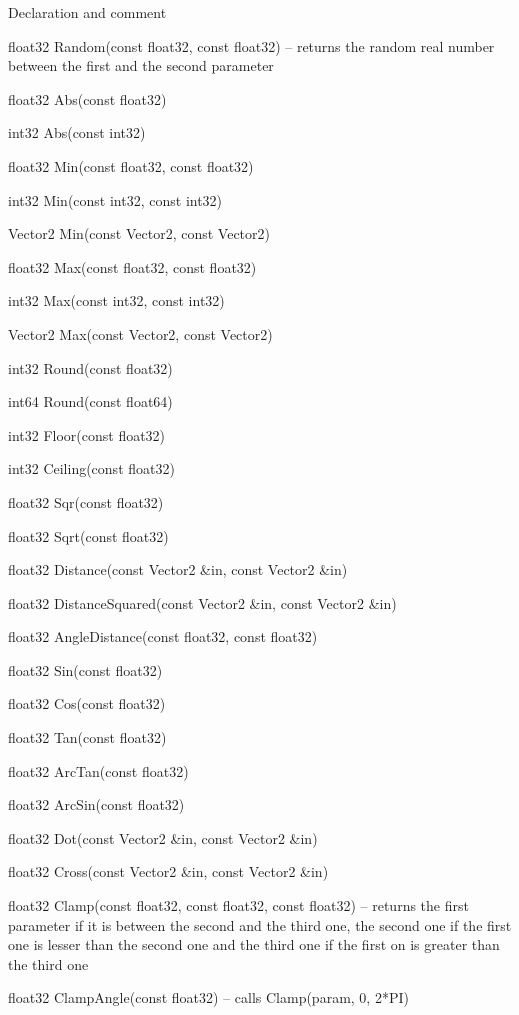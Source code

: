 \begin{titled-itemize}{Declaration and comment}
  \item float32 Random(const float32, const float32) -- returns the random real number between the first and the second parameter
  \item float32 Abs(const float32)
  \item int32 Abs(const int32)
  \item float32 Min(const float32, const float32)
  \item int32 Min(const int32, const int32)
  \item Vector2 Min(const Vector2, const Vector2)
  \item float32 Max(const float32, const float32)
  \item int32 Max(const int32, const int32)
  \item Vector2 Max(const Vector2, const Vector2)
  \item int32 Round(const float32)
  \item int64 Round(const float64)
  \item int32 Floor(const float32)
  \item int32 Ceiling(const float32)
  \item float32 Sqr(const float32)
  \item float32 Sqrt(const float32)
  \item float32 Distance(const Vector2 \&in, const Vector2 \&in)
  \item float32 DistanceSquared(const Vector2 \&in, const Vector2 \&in)
  \item float32 AngleDistance(const float32, const float32)
  \item float32 Sin(const float32)
  \item float32 Cos(const float32)
  \item float32 Tan(const float32)
  \item float32 ArcTan(const float32)
  \item float32 ArcSin(const float32)
  \item float32 Dot(const Vector2 \&in, const Vector2 \&in)
  \item float32 Cross(const Vector2 \&in, const Vector2 \&in)
  \item float32 Clamp(const float32, const float32, const float32) -- returns the first parameter if it is between the second and the third one, the second one if the first one is lesser than the second one and the third one if the first on is greater than the third one
  \item float32 ClampAngle(const float32) -- calls Clamp(param, 0, 2*PI)

\end{titled-itemize}
